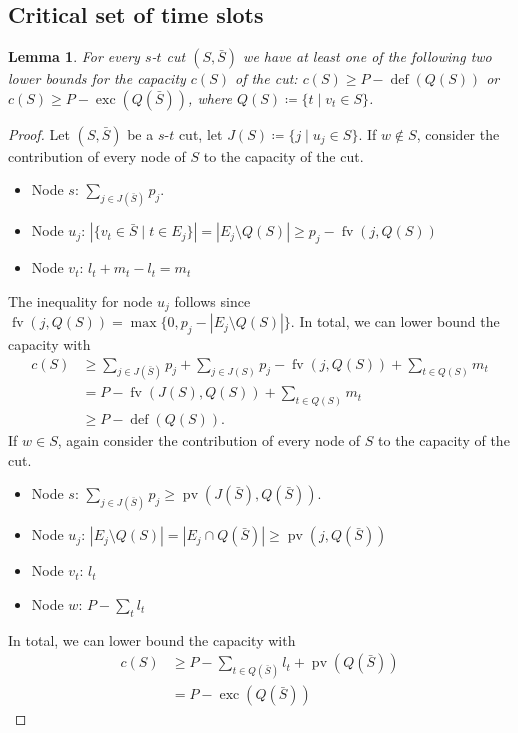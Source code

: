\documentclass[a4paper]{article}
\DeclareMathOperator{\fv}{fv}
\DeclareMathOperator{\pv}{pv}
\DeclareMathOperator{\opdef}{def}
\DeclareMathOperator{\exc}{exc}
\newtheorem{lemma}[theorem]{Lemma}
\begin{document}
\subsection{Critical set of time slots}
\begin{lemma}\label{lemma:cut}
  For every $s$-$t$ cut $(S, \bar S)$ we have at least one of the following two lower bounds for the capacity $c(S)$ of the cut:
  $c(S) \geq P - \opdef(Q(S))$ or $c(S) \geq P - \exc(Q(\bar S))$, where $Q(S) \coloneqq \{ t \mid v_t \in S \}$.
\end{lemma}
\begin{proof}
  Let $(S, \bar S)$ be a $s$-$t$ cut, let $J(S) \coloneqq \{j \mid u_j \in S\}$.
  If $w \notin S$, consider the contribution of every node of $S$ to the capacity of the cut.
  \begin{itemize}
    \item Node $s$: $\sum_{j \in J(\bar S)} p_j$.
    \item Node $u_j$: $|\{v_t \in \bar S \mid t \in E_j\}| = | E_j \setminus Q(S) | \geq p_j - \fv(j, Q(S))$
    \item Node $v_t$: $l_t + m_t - l_t = m_t$
  \end{itemize}
  The inequality for node $u_j$ follows since $\fv(j, Q(S)) = \max \{0, p_j - |E_j \setminus Q(S)| \}$.
  In total, we can lower bound the capacity with
  \begin{align}
    c(S) &\geq \sum_{j \in J(\bar S)} p_j + \sum_{j \in J(S)} p_j - \fv(j, Q(S)) + \sum_{t \in Q(S)} m_t
    \\ &= P - \fv(J(S), Q(S)) + \sum_{t \in Q(S)} m_t
    \\ &\geq P - \opdef(Q(S))\text{.}
  \end{align}
  If $w \in S$, again consider the contribution of every node of $S$ to the capacity of the cut.
  \begin{itemize}
    \item Node $s$: $\sum_{j \in J(\bar S)} p_j \geq \pv(J(\bar S), Q(\bar S))$.
    \item Node $u_j$: $| E_j \setminus Q(S) |
      = | E_j \cap Q(\bar S)| \geq \pv(j, Q(\bar S))$
    \item Node $v_t$: $l_t$
    \item Node $w$: $P - \sum_t l_t$
  \end{itemize}
  In total, we can lower bound the capacity with
  \begin{align}
    c(S) &\geq P - \sum_{t \in Q(\bar S)} l_t + \pv(Q(\bar S))
    \\ &= P - \exc(Q(\bar S))
  \end{align}

\end{proof}
\end{document}
